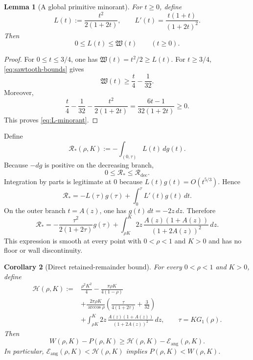 \documentclass[11pt]{article}
\newtheorem{lemma}{Lemma}
\newtheorem{corollary}[lemma]{Corollary}
\theoremstyle{remark}
\begin{document}
\begin{lemma}[A global primitive minorant]
\label{lem:L-minorant}
For $t\geq0$, define
\begin{equation}
 L(t):=\frac{t^2}{2(1+2t)},
 \qquad
 L'(t)=\frac{t(1+t)}{(1+2t)^2}.
 \label{eq:L-def}
\end{equation}
Then
\begin{equation}
 0\leq L(t)\leq\mathfrak W(t)
 \qquad(t\geq0).
 \label{eq:L-minorant}
\end{equation}
\end{lemma}

\begin{proof}
For $0\leq t\leq3/4$, one has
$\mathfrak W(t)=t^2/2\geq L(t)$.  For $t\geq3/4$,
\eqref{eq:sawtooth-bounds} gives
\[
 \mathfrak W(t)\geq\frac t4-\frac1{32}.
\]
Moreover,
\[
 \frac t4-\frac1{32}-\frac{t^2}{2(1+2t)}
 =\frac{6t-1}{32(1+2t)}\geq0.
\]
This proves \eqref{eq:L-minorant}.
\end{proof}

Define
\begin{equation}
 \mathcal R_*(\rho,K):=-\int_{(0,\tau)}L(t)\,dg(t).
 \label{eq:R-star-def}
\end{equation}
Because $-dg$ is positive on the decreasing branch,
\begin{equation}
 0\leq\mathcal R_*\leq\mathcal R_{\mathrm{dec}}.
 \label{eq:R-star-order}
\end{equation}
Integration by parts is legitimate at $0$ because
$L(t)g(t)=O(t^{5/3})$.  Hence
\begin{equation}
 \mathcal R_*
 =-L(\tau)g(\tau)+\int_0^\tau L'(t)g(t)\,dt.
 \label{eq:R-star-parts}
\end{equation}
On the outer branch $t=A(z)$, one has
$g(t)\,dt=-2z\,dz$.  Therefore
\begin{equation}
 \mathcal R_*
 =-\frac{\tau^2}{2(1+2\tau)}g(\tau)
 +\int_{\rho K}^{K}
   2z\,\frac{A(z)(1+A(z))}{(1+2A(z))^2}\,dz.
 \label{eq:R-star-action}
\end{equation}
This expression is smooth at every point with $0<\rho<1$ and $K>0$ and has
no floor or wall discontinuity.

\begin{corollary}[Direct retained-remainder bound]
\label{cor:sufficient}
For every $0<\rho<1$ and $K>0$, define
\begin{equation}
 \begin{aligned}
 \mathcal H(\rho,K):={}&
 \frac{\rho^2K^2}{4}
 -\frac{\pi\rho K}{4(1-\rho)}\\
 &+\frac{2\pi\rho K}{\arccos\rho}
   \left(\frac{\tau}{4(1+2\tau)}+\frac3{32}\right)\\
 &+\int_{\rho K}^{K}
   2z\,\frac{A(z)(1+A(z))}{(1+2A(z))^2}\,dz,
 \qquad \tau=KG_1(\rho).
 \end{aligned}
 \label{eq:H-def}
\end{equation}
Then
\begin{equation}
 W(\rho,K)-P(\rho,K)
 \geq \mathcal H(\rho,K)-\mathcal E_{\mathrm{ang}}(\rho,K).
 \label{eq:direct-structural-gap}
\end{equation}
In particular,
$\mathcal E_{\mathrm{ang}}(\rho,K)<\mathcal H(\rho,K)$ implies
$P(\rho,K)<W(\rho,K)$.
\end{corollary}
\end{document}
